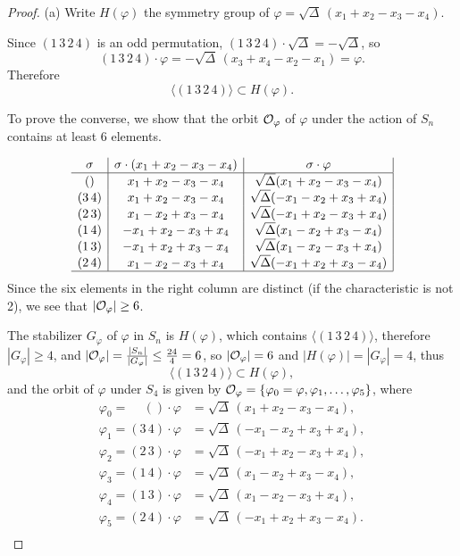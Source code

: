 \documentclass[11pt,a4paper]{article}
\begin{document}
\begin{proof}

\item[(a)] Write $H(\varphi)$ the symmetry group of $\varphi = \sqrt{\Delta}\,(x_1+x_2 - x_3-x_4)$.

Since $(1\,3\,2\,4)$ is an odd permutation, $(1\,3\,2\,4)\cdot \sqrt{\Delta} = -\sqrt{\Delta}$, so
$$(1\,3\,2\,4)\cdot \varphi = -\sqrt{\Delta}\, (x_3 +x_4 - x_2 - x_1) = \varphi.$$
Therefore
 $$\langle (1\,3\,2\,4)\rangle \subset H(\varphi).$$
 
 To prove the converse, we show that the orbit ${\cal O}_\varphi$ of $\varphi$ under the action of $S_n$ contains at least 6 elements.
 
 $$
 \begin{array}{c|c|c|}
 \sigma & \sigma \cdot (x_1+x_2 - x_3 - x_4) & \sigma \cdot \varphi\\
 \hline
()& x_1 + x_2 - x_3 - x_4 & \sqrt{\Delta}(x_1+x_2-x_3-x_4)\\
 (3\, 4) & x_1 + x_2 -x_3 -x_4 & \sqrt{\Delta}(-x_1-x_2+x_3+x_4)\\
 (2\,3) & x_1-x_2+x_3 - x_4 & \sqrt{\Delta} (-x_1+x_2 - x_3 +x_4)\\
 (1\, 4) & -x_1 + x_2 -x_3 + x_4 & \sqrt{\Delta}(x_1 -x_2+x_3-x_4)\\
 (1\, 3) & -x_1 + x_2 + x_3 -x_4 & \sqrt{\Delta} (x_1-x_2 -x_3 + x_4)\\
 (2\, 4) &x_1 -x_2 -x_3 + x_4 & \sqrt{\Delta}(-x_1 + x_2 + x_3 -x_4)\\
 \hline
 \end{array}
 $$
Since the six elements in the right column are distinct (if the characteristic is not 2), we see that $|{\cal O}_\varphi| \geq 6$.

The stabilizer $G_\varphi$ of $\varphi$ in $S_n$ is $H(\varphi)$, which contains $\langle (1\,3\,2\,4)\rangle$, therefore $|G_\varphi| \geq 4$, and  $|{\cal O}_\varphi| =\frac{|S_n|}{|G_\varphi|} \leq \frac{24}{4} = 6$, so $|{\cal O}_\varphi| = 6$ and $|H(\varphi)| = |G_\varphi| = 4$, thus
$$\langle (1\,3\,2\,4)\rangle \subset H(\varphi),$$
and the orbit of $\varphi$ under $S_4$ is given by ${\cal O}_\varphi = \{\varphi_0= \varphi, \varphi_1,\ldots,\varphi_5\}$, where
\begin{align*}
\varphi_0  = \phantom{3\,4}() \cdot \varphi &= \sqrt{\Delta}\, (x_1+x_2 - x_3-x_4),\\
\varphi_1 = (3\,4)\cdot \varphi &= \sqrt{\Delta}\, ( - x_1-x_2 + x_3 +x_4),\\
\varphi_2 = (2\,3)\cdot \varphi &= \sqrt{\Delta}\, ( - x_1+ x_2 -x_3+x_4),\\
\varphi_3 = (1\,4) \cdot \varphi &= \sqrt{\Delta}\, (x_1- x_2 +x_3 -x_4),\\
\varphi_4= (1\,3) \cdot \varphi &= \sqrt{\Delta}\, (x_1 - x_2   -x_3+x_4),\\
\varphi_5= (2\,4) \cdot \varphi &= \sqrt{\Delta}\, ( - x_1+ x_2+x_3 -x_4).\\
\end{align*}


\end{proof}
\end{document}
